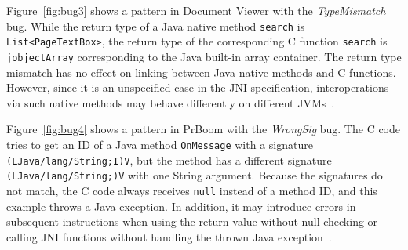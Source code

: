 Figure~\ref{fig:bug3} shows a pattern in Document Viewer with the {\it TypeMismatch} bug.
While the return type of a Java native method {\tt search}
is {\tt List<PageTextBox>}, the return type of the corresponding C function
{\tt search} is {\tt jobjectArray} corresponding to the Java built-in array
container. The return type mismatch has no effect on linking between
Java native methods and C functions. However, since it is an unspecified case in
the JNI specification, interoperations via such native methods may behave
differently on different JVMs~\cite{LeeASE20}. 


Figure~\ref{fig:bug4} shows a pattern in PrBoom with the {\it WrongSig} bug.
The C code tries to get an ID of a Java method {\tt OnMessage} with a
signature \texttt{(LJava/lang/String;I)V}, but the method has a different
signature \texttt{(LJava/lang/String;)V} with one String argument. Because
the signatures do not match, the C code always receives {\tt null}
instead of a method ID, and this example throws a Java exception. In
addition, it may introduce errors in subsequent instructions when using the
return value without null checking or calling JNI functions without handling the
thrown Java exception~\cite{jniexcept}.
